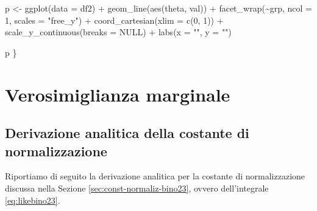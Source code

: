 \documentclass[
  11pt,
]{krantz}
\makeatletter
\newenvironment{Shaded}{\begin{snugshade}}{\end{snugshade}}
\newcommand{\AttributeTok}[1]{\textcolor[rgb]{0.61,0.61,0.61}{#1}}
\newcommand{\ConstantTok}[1]{\textcolor[rgb]{0,0,0}{#1}}
\newcommand{\DecValTok}[1]{\textcolor[rgb]{0.06,0.06,0.06}{#1}}
\newcommand{\FunctionTok}[1]{\textcolor[rgb]{0,0,0}{#1}}
\newcommand{\NormalTok}[1]{#1}
\newcommand{\OtherTok}[1]{\textcolor[rgb]{0.37,0.37,0.37}{#1}}
\newcommand{\SpecialCharTok}[1]{\textcolor[rgb]{0,0,0}{#1}}
\newcommand{\StringTok}[1]{\textcolor[rgb]{0.5,0.5,0.5}{#1}}
\newenvironment{kframe}{%
\medskip{}
\setlength{\fboxsep}{.8em}
 \def\at@end@of@kframe{}%
 \ifinner\ifhmode%
  \def\at@end@of@kframe{\end{minipage}}%
  \begin{minipage}{\columnwidth}%
 \fi\fi%
 \def\FrameCommand##1{\hskip\@totalleftmargin \hskip-\fboxsep
 \colorbox{shadecolor}{##1}\hskip-\fboxsep
     \hskip-\linewidth \hskip-\@totalleftmargin \hskip\columnwidth}%
 \MakeFramed {\advance\hsize-\width
   \@totalleftmargin\z@ \linewidth\hsize
   \@setminipage}}%
 {\par\unskip\endMakeFramed%
 \at@end@of@kframe}
\renewenvironment{Shaded}{\begin{kframe}}{\end{kframe}}
\theoremstyle{definition}
\theoremstyle{definition}
\theoremstyle{definition}
\theoremstyle{definition}
\theoremstyle{remark}
\makeatother
\begin{document}
\begin{Shaded}
\begin{Highlighting}[]
\NormalTok{  p }\OtherTok{\textless{}{-}} \FunctionTok{ggplot}\NormalTok{(}\AttributeTok{data =}\NormalTok{ df2) }\SpecialCharTok{+}
    \FunctionTok{geom\_line}\NormalTok{(}\FunctionTok{aes}\NormalTok{(theta, val)) }\SpecialCharTok{+}
    \FunctionTok{facet\_wrap}\NormalTok{(}\SpecialCharTok{\textasciitilde{}}\NormalTok{grp, }\AttributeTok{ncol =} \DecValTok{1}\NormalTok{, }\AttributeTok{scales =} \StringTok{"free\_y"}\NormalTok{) }\SpecialCharTok{+}
    \FunctionTok{coord\_cartesian}\NormalTok{(}\AttributeTok{xlim =} \FunctionTok{c}\NormalTok{(}\DecValTok{0}\NormalTok{, }\DecValTok{1}\NormalTok{)) }\SpecialCharTok{+}
    \FunctionTok{scale\_y\_continuous}\NormalTok{(}\AttributeTok{breaks =} \ConstantTok{NULL}\NormalTok{) }\SpecialCharTok{+}
    \FunctionTok{labs}\NormalTok{(}\AttributeTok{x =} \StringTok{""}\NormalTok{, }\AttributeTok{y =} \StringTok{""}\NormalTok{)}

\NormalTok{  p}
\NormalTok{\}}
\end{Highlighting}
\end{Shaded}

\hypertarget{appendix:const-norm-bino23}{%
\chapter{Verosimiglianza marginale}\label{appendix:const-norm-bino23}}

\hypertarget{derivazione-analitica-della-costante-di-normalizzazione}{%
\section{Derivazione analitica della costante di normalizzazione}\label{derivazione-analitica-della-costante-di-normalizzazione}}

Riportiamo di seguito la derivazione analitica per la costante di normalizzazione discussa nella Sezione \ref{sec:const-normaliz-bino23}, ovvero dell'integrale \eqref{eq:likebino23}.
\end{document}
